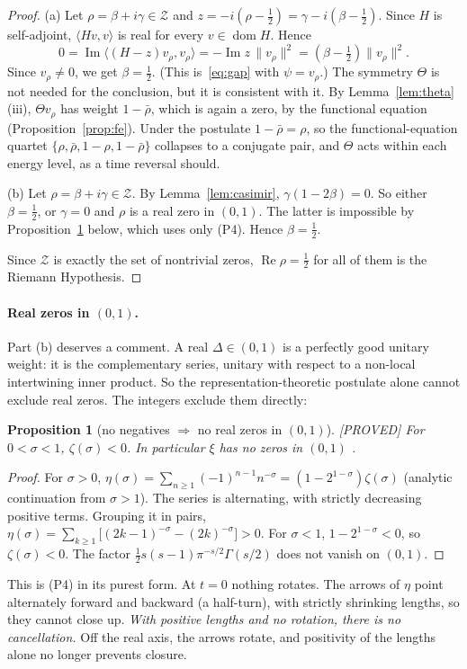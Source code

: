 \documentclass[11pt,a4paper]{article}
\theoremstyle{plain}
\newtheorem{proposition}[theorem]{Proposition}
\theoremstyle{definition}
\theoremstyle{remark}
\newcommand{\lab}[1]{\textsf{\small[#1]}}
\newcommand{\PROVED}{\lab{PROVED}}
\renewcommand{\Re}{\operatorname{Re}}
\renewcommand{\Im}{\operatorname{Im}}
\begin{document}
\begin{proof}
(a) Let $\rho=\beta+i\gamma\in\mathcal Z$ and $z=-i(\rho-\tfrac12)
=\gamma-i(\beta-\tfrac12)$. Since $H$ is self-adjoint, $\langle Hv,v\rangle$
is real for every $v\in\operatorname{dom}H$. Hence
\[
0=\Im\langle(H-z)v_\rho,v_\rho\rangle=-\Im z\,\|v_\rho\|^2
=(\beta-\tfrac12)\|v_\rho\|^2 .
\]
Since $v_\rho\neq0$, we get $\beta=\tfrac12$. (This is~\eqref{eq:gap} with
$\psi=v_\rho$.) The symmetry $\Theta$ is not needed for the conclusion, but
it is consistent with it. By Lemma~\ref{lem:theta}(iii), $\Theta v_\rho$ has
weight $1-\bar\rho$, which is again a zero, by the functional equation
(Proposition~\ref{prop:fe}). Under the postulate $1-\bar\rho=\rho$, so the
functional-equation quartet $\{\rho,\bar\rho,1-\rho,1-\bar\rho\}$ collapses
to a conjugate pair, and $\Theta$ acts within each energy level, as a time
reversal should.

(b) Let $\rho=\beta+i\gamma\in\mathcal Z$. By Lemma~\ref{lem:casimir},
$\gamma(1-2\beta)=0$. So either $\beta=\tfrac12$, or $\gamma=0$ and $\rho$ is
a real zero in $(0,1)$. The latter is impossible by
Proposition~\ref{prop:noreal} below, which uses only (P4). Hence $\beta=\tfrac12$.

Since $\mathcal Z$ is exactly the set of nontrivial zeros, $\Re\rho=\tfrac12$
for all of them is the Riemann Hypothesis.
\end{proof}

\paragraph{Real zeros in $(0,1)$.} Part (b) deserves a comment. A real
$\Delta\in(0,1)$ is a perfectly good unitary weight: it is the complementary
series, unitary with respect to a non-local intertwining inner product. So
the representation-theoretic postulate alone cannot exclude real zeros. The
integers exclude them directly:

\begin{proposition}[no negatives $\Rightarrow$ no real zeros in $(0,1)$]\label{prop:noreal}
\PROVED{} For $0<\sigma<1$, $\zeta(\sigma)<0$. In particular $\xi$ has no
zeros in $(0,1)$ \cite{Titchmarsh1986,Edwards1974}.
\end{proposition}
\begin{proof}
For $\sigma>0$,
$\eta(\sigma)=\sum_{n\ge1}(-1)^{n-1}n^{-\sigma}=(1-2^{1-\sigma})\zeta(\sigma)$
(analytic continuation from $\sigma>1$). The series is alternating, with
strictly decreasing positive terms. Grouping it in pairs,
$\eta(\sigma)=\sum_{k\ge1}\bigl[(2k-1)^{-\sigma}-(2k)^{-\sigma}\bigr]>0$.
For $\sigma<1$, $1-2^{1-\sigma}<0$, so $\zeta(\sigma)<0$. The factor
$\tfrac12s(s-1)\pi^{-s/2}\Gamma(s/2)$ does not vanish on $(0,1)$.
\end{proof}
\noindent
This is (P4) in its purest form. At $t=0$ nothing rotates. The arrows of
$\eta$ point alternately forward and backward (a half-turn), with strictly
shrinking lengths, so they cannot close up. \emph{With positive lengths and
no rotation, there is no cancellation.} Off the real axis, the arrows
rotate, and positivity of the lengths alone no longer prevents closure.
\end{document}
